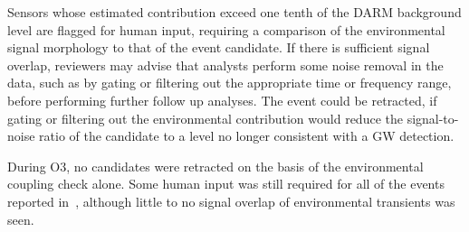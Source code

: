 Sensors whose estimated contribution exceed one tenth of the \ac{DARM} background level are flagged for human input, requiring a comparison of the environmental signal morphology to that of the event candidate.
If there is sufficient signal overlap, reviewers may advise that analysts perform some noise removal in the data, such as by gating or filtering out the appropriate time or frequency range, before performing further follow up analyses.
The event could be retracted, if gating or filtering out the environmental contribution would reduce the signal-to-noise ratio of the candidate to a level no longer consistent with a GW detection.

During \ac{O3}, no candidates were retracted on the basis of the environmental coupling check alone.
Some human input was still required for all of the \XX events reported in~\citep{gwtc2}, although little to no signal overlap of environmental transients was seen.
